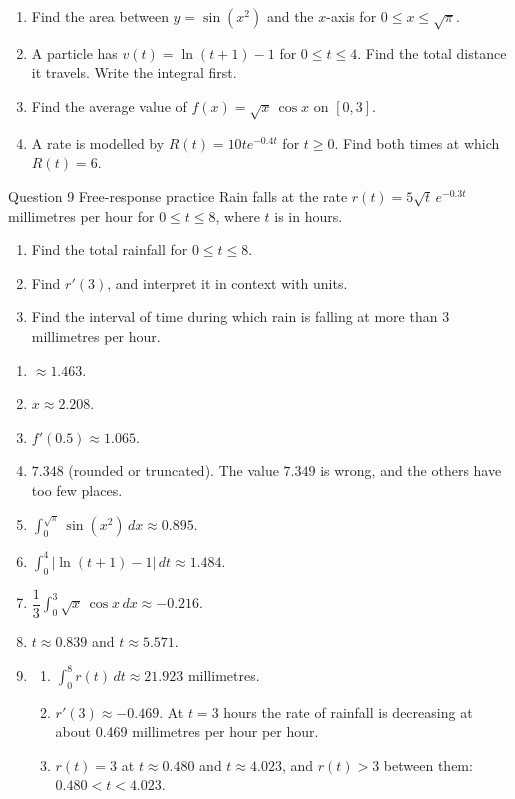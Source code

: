\documentclass[11pt]{article}
\begin{document}
\begin{enumerate}[leftmargin=*,itemsep=2pt,start=5]
  \item Find the area between $y=\sin\!\left(x^2\right)$ and the $x$-axis for $0\le x\le\sqrt{\pi}$.\work{2.8cm}
  \item A particle has $v(t)=\ln(t+1)-1$ for $0\le t\le4$. Find the total distance it travels. Write the integral first.\work{2.8cm}
  \item Find the average value of $f(x)=\sqrt{x}\,\cos x$ on $[0,3]$.\work{2.8cm}
  \item A rate is modelled by $R(t)=10te^{-0.4t}$ for $t\ge0$. Find both times at which $R(t)=6$.\work{2.8cm}
\end{enumerate}

\begin{frbox}{Question 9 \textperiodcentered{} Free-response practice}
Rain falls at the rate $r(t)=5\sqrt{t}\,e^{-0.3t}$ millimetres per hour for $0\le t\le8$, where $t$ is in hours.
\begin{enumerate}[label=(\alph*),leftmargin=*,itemsep=2pt]
  \item Find the total rainfall for $0\le t\le8$.\work{2.6cm}
  \item Find $r'(3)$, and interpret it in context with units.\work{2.6cm}
  \item Find the interval of time during which rain is falling at more than 3 millimetres per hour.\work{2.6cm}
\end{enumerate}
\end{frbox}

\newpage
\begin{solbox}
\begin{enumerate}[leftmargin=*,itemsep=4pt]
  \item $\approx1.463$.
  \item $x\approx2.208$.
  \item $f'(0.5)\approx1.065$.
  \item $7.348$ (rounded or truncated). The value $7.349$ is wrong, and the others have too few places.
  \item $\displaystyle\int_{0}^{\sqrt\pi}\sin\!\left(x^2\right)\,dx\approx0.895$.
  \item $\displaystyle\int_{0}^{4}\left|\ln(t+1)-1\right|\,dt\approx1.484$.
  \item $\dfrac13\displaystyle\int_{0}^{3}\sqrt x\,\cos x\,dx\approx-0.216$.
  \item $t\approx0.839$ and $t\approx5.571$.
  \item \begin{enumerate}[label=(\alph*),leftmargin=*,itemsep=3pt]
    \item $\displaystyle\int_{0}^{8}r(t)\,dt\approx21.923$ millimetres.
    \item $r'(3)\approx-0.469$. At $t=3$ hours the rate of rainfall is decreasing at about 0.469 millimetres per hour per hour.
    \item $r(t)=3$ at $t\approx0.480$ and $t\approx4.023$, and $r(t)>3$ between them: $0.480<t<4.023$.
  \end{enumerate}
\end{enumerate}
\end{solbox}
\end{document}

